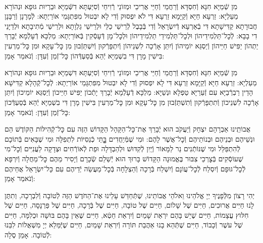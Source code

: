 \documentclass[twoside, openany, parskip=half, 11pt]{book}
\begin{document}

\shabbos\\
 מִן שְֿׁמַיָּא חִנָּא וְֿחִסְדָּא וְֿרַחֲמֵי וְֿחַיֵּי אֲרִיכֵי וּמְזוֹנֵי רְֿוִיחֵי וְֿסִיַּעְתָּא דִשְּֿׁמַיָּא וּבַרְיוּת גּוּפָא וּנְהוֹרָא מַעַלְיָא: זַרְעָא חַיָּא וְֿקַיָּמָא זַרְעָא דִּי לֹא יִפְסוּק וְֿדִי לָא יִבְטוּל מִפִּתְגָּמֵי אוֹרַיְתָא: לְֿמָרָנָן וְֿרַבָּנָן חֲבוּרָתָא קַדִּישָׁתָא דִּי בְֿאַרְעָא דְֿיִשְׂרָאֵל וְֿדִי בְּֿבָבֶל לְֿרֵישֵׁי כַלֵּי וּלְרֵישֵׁי גַלְוָתָא וּלְרֵישֵׁי מְֿתִיבָתָא וּלְדַיָּנֵי דִי בָבָא: לְֿכׇל־תַּלְמִידֵיהוֹן וּלְכׇל־תַּלְמִידֵי תַלְמִידֵיהוֹן וּלְכׇל־מָן דְּֿעָסְֿקִין בְּֿאוֹרַיְתָא: מַלְכָּא דְֿעָלְֿמָא יְֿבָרֵךְ יַתְהוֹן יַפִּישׁ חַיֵּיהוֹן וְֿיַסְגֵּא יוֹמֵיהוֹן וְֿיִתֵּן אָרְֿכָה לִשְׁנֵיהוֹן וְֿיִתְפָּרְֿקוּן וְֿיִשְׁתֵּזְֿבוּן מִן כׇּל־עָקָא וּמִן כׇּל־מַרְעִין בִּישִׁין מָרָן דִּי בִשְׁמַיָּא יְֿהֵא בְּֿסַעְדְּֿהוֹן כׇּל־זְֿמַן וְֿעִדָּן: וְֿנֹאמַר אָמֵן:



 מִן שְֿׁמַיָּא חִנָּא וְֿחִסְדָּא וְֿרַחֲמֵי וְֿחַיֵּי אֲרִיכֵי וּמְזוֹנֵי רְֿוִיחֵי וְֿסִיַּעְתָּא דִּשְׁמַיָּא וּבַרְיוּת גּוּפָא וּנְהוֹרָא מַעַלְיָא: זַרְעָא חַיָּא וְֿקַיָּמָא זַרְעָא דִּי לָא יִפְסוּק וְֿדִי לָא יִבְטוּל מִפִּתְגָּמֵי אוֹרַיְתָא: לְֿכׇל־קְֿהָלָא קַדִּישָׁא הָדֵין רַבְרְֿבַיָּא עִם זְֿעֵרַיָּא טַפְלָא וּנְשַׁיָּא: מַלְכָּא דְֿעָלְֿמָא יְֿבָרֵךְ יָתְֿכוֹן יַפִּישׁ חַיֵּיכוֹן וְֿיַסְגֵּא יוֹמֵיכוֹן וְֿיִתֵּן אָרְֿכָה לִשְׁנֵיכוֹן וְֿתִתְפָּרְֿקוּן וְֿתִשְׁתֵּזְֿבוּן מִן כׇּל־עָקָא וּמִן כׇּל־מַרְעִין בִּישִׁין מָרָן דִּי בִשְׁמַיָּא יְֿהֵא בְּֿסַעְדְּֿכוֹן כׇּל־זְֿמַן וְֿעִדָּן: וְֿנֹאמַר אָמֵן:

 אֲבוֹתֵֽינוּ אַבְרָהָם יִצְחָק וְֿיַעֲקֹב הוּא יְֿבָרֵךְ אֶת־כׇּל־הַקָּהָל הַקָּדוֹשׁ הַזֶּה עִם כׇּל־קְֿהִילּוֹת הַקּוֹדֶשׁ הֵם וּנְשֵׁיהֶם וּבְנֵיהֶם וּבְנוֹתֵיהֶם וְֿכׇל־אֲשֶׁר לָהֶם: וּמִי שֶׁמְּֿיַחֲדִים בׇׇׇׇָּתֵּי כְֿנֵסִיּוֹת לִתְפִלָּה וּמִי שֶׁבָּאִים בְּֿתוֹכָם לְֿהִתְפַּלֵּל וּמִי שֶׁנּוֹתְֿנִים נֵר לַמָּאוֹר וְֿיַֽיִן לְֿקִדּוּשׁ וּלְהַבְדָּלָה וּפַת לְֿאוֹרְֿחִים וּצְדָקָה לַעֲנִיִּים וְֿכׇל־מִי שֶׁעוֹסְֿקִים בְּֿצׇרְכֵי צִבּוּר בֶּאֱמוּנָה הַקָּדוֹשׁ בָּרוּךְ הוּא יְֿשַׁלֵם שְֿׂכָרָם וְֿיָסִיר מֵהֶם כׇּל־מַחֲלָה וְֿיִרְפָּא לְֿכׇל־גּוּפָם וְֿיִסְלַח לְֿכׇל־עֲוֹנָם וְֿיִשְׁלַח בְּֿרָכָה וְֿהַצְלָחָה בְּֿכׇל־מַעֲשֵׂה יְֿדֵיהֶם עִם כָּל־יִשְׂרָאֵל אֲחֵיהֶם וְֿנֹאמַר אָמֵן:


יְהִי רָצוֹן מִלְּֿפָנֶיךָ יְיָ אֱלֹהֵינוּ וֵאלֹהֵי אֲבוֹתֵינוּ,
שֶׁתְּֿחַדֵּשׁ עָלֵינוּ אֶת־הַחֹדֶשׁ הַזֶּה לְֿטוֹבָה וְֿלִבְרָכָה,
וְתִתֶּן לָנוּ חַיִּים אֲרוּכִים,
חַיִּים שֶׁל שָׁלוֹם,
חַיִּים שֶׁל טוֹבָה,
חַיִּים שֶׁל בְּֿרָכָה,
חַיִּים שֶׁל פַּרְנָסָה,
חַיִּים שֶׁל חִלּוּץ עֲצָמוֹת,
חַיִּים שֶׁיֵשׁ בָּהֶם יִרְאַת שָׁמַיִם וְֿיִרְאַת חֵטְֿא,
חַיִּים שֶׁאֵין בָּהֶם בּוּשָׁה וּכְלִמָּה,
חַיִּים שֶׁל עשֶׁר וְֿכָבוֹד,
חַיִּים שֶׁתְּֿהֵא בָנוּ אַהֲבַת תּוֹרָה וְֿיִרְאַת שָׁמַיִם,
חַיִּים שֶׁיְּֿמַּלֵא יְיָ מִשְׁאֲלוֹת לִבֵּנוּ לְֿטוֹבָה. אָמֵן סֶלָה:
\end{document}
